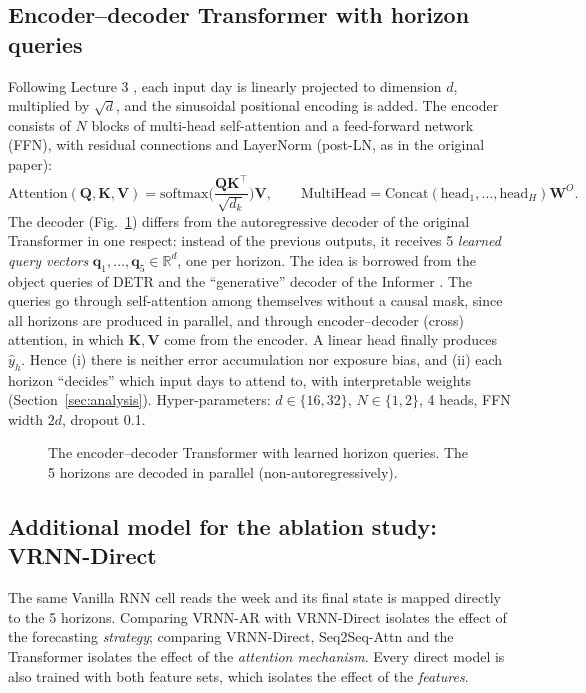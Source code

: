 \documentclass[11pt,a4paper]{article}
\newcommand{\R}{\mathbb{R}}
\newcommand{\yhat}{\hat{y}}
\begin{document}
\subsection{Encoder--decoder Transformer with horizon queries}
Following Lecture 3 \cite{vaswani2017}, each input day is linearly projected to dimension $d$, multiplied by $\sqrt d$, and the sinusoidal positional encoding is added. The encoder consists of $N$ blocks of multi-head self-attention and a feed-forward network (FFN), with residual connections and LayerNorm (post-LN, as in the original paper):
\begin{equation}
  \mathrm{Attention}(\mathbf Q,\mathbf K,\mathbf V)=\mathrm{softmax}\!\Big(\frac{\mathbf Q\mathbf K^{\top}}{\sqrt{d_k}}\Big)\mathbf V,\qquad
  \mathrm{MultiHead}=\mathrm{Concat}(\mathrm{head}_1,\dots,\mathrm{head}_H)\mathbf W^O .
\end{equation}
The decoder (Fig.~\ref{fig:transformer}) differs from the autoregressive decoder of the original Transformer in one respect: instead of the previous outputs, it receives 5 \emph{learned query vectors} $\mathbf q_1,\dots,\mathbf q_5\in\R^d$, one per horizon. The idea is borrowed from the object queries of DETR \cite{carion2020} and the ``generative'' decoder of the Informer \cite{zhou2021}. The queries go through self-attention among themselves without a causal mask, since all horizons are produced in parallel, and through encoder--decoder (cross) attention, in which $\mathbf K,\mathbf V$ come from the encoder. A linear head finally produces $\yhat_h$. Hence (i) there is neither error accumulation nor exposure bias, and (ii) each horizon ``decides'' which input days to attend to, with interpretable weights (Section~\ref{sec:analysis}). Hyper-parameters: $d\in\{16,32\}$, $N\in\{1,2\}$, 4 heads, FFN width $2d$, dropout 0.1.

\begin{figure}[tbp]
  \centering
  \resizebox{0.9\linewidth}{!}{\unskip}
  \caption{The encoder--decoder Transformer with learned horizon queries. The 5 horizons are decoded in parallel (non-autoregressively).}
  \label{fig:transformer}
\end{figure}

\subsection{Additional model for the ablation study: VRNN-Direct}
The same Vanilla RNN cell reads the week and its final state is mapped directly to the 5 horizons. Comparing VRNN-AR with VRNN-Direct isolates the effect of the forecasting \emph{strategy}; comparing VRNN-Direct, Seq2Seq-Attn and the Transformer isolates the effect of the \emph{attention mechanism}. Every direct model is also trained with both feature sets, which isolates the effect of the \emph{features}.
\end{document}
